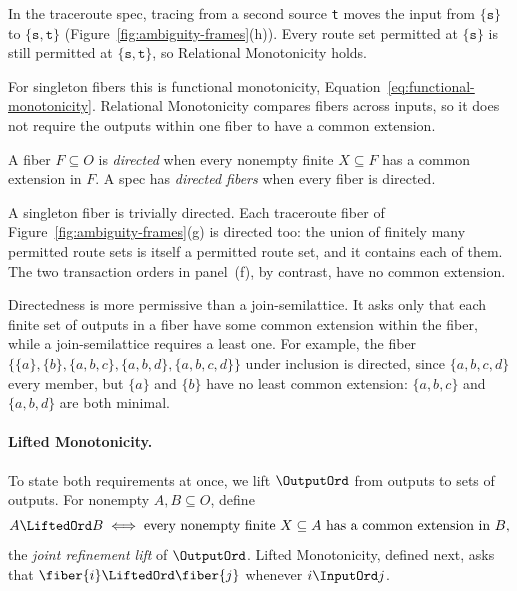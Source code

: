 In the traceroute spec, tracing from a second source \texttt{t} moves the
input from $\{\texttt{s}\}$ to $\{\texttt{s},\texttt{t}\}$
(Figure~\ref{fig:ambiguity-frames}(h)).  Every route set permitted at
$\{\texttt{s}\}$ is still permitted at $\{\texttt{s},\texttt{t}\}$, so
Relational Monotonicity holds.

For singleton fibers this is functional monotonicity,
Equation~\ref{eq:functional-monotonicity}.  Relational Monotonicity compares fibers across inputs, so it does not
require the outputs within one fiber to have a common extension.

\begin{definition}
\label{def:fiber-directedness}\label{def:directed-outputs}
A fiber $F\subseteq O$ is \emph{directed} when every nonempty finite
$X\subseteq F$ has a common extension in $F$.  A spec has \emph{directed fibers} when
every fiber is directed.
\end{definition}

A singleton fiber is trivially directed.  Each traceroute fiber of
Figure~\ref{fig:ambiguity-frames}(g) is directed too: the union of finitely
many permitted route sets is itself a permitted route set, and it contains each
of them.  The two transaction orders in panel~(f), by contrast, have no common extension.

Directedness is more permissive than a join-semilattice.  It asks only that
each finite set of outputs in a fiber have some common extension within the
fiber, while a join-semilattice requires a least one.  For example, the fiber
$\{\{a\},\{b\},\{a,b,c\},\{a,b,d\},\{a,b,c,d\}\}$ under inclusion is directed,
since $\{a,b,c,d\}$ \outrel every member, but $\{a\}$ and $\{b\}$ have no least common extension: $\{a,b,c\}$ and $\{a,b,d\}$ are both minimal.

\paragraph{Lifted Monotonicity.}
To state both requirements at once, we lift $\OutputOrd$ from outputs to sets
of outputs.  For nonempty
$A,B\subseteq O$, define
        \begin{equation}
  A\LiftedOrd B
  \;\Longleftrightarrow\;
  \text{every nonempty finite }X\subseteq A\text{ has a common extension in }B,
  \label{eq:joint-output-order}
        \end{equation}
the \emph{joint refinement lift} of $\OutputOrd$.  Lifted Monotonicity, defined
next, asks that $\fiber{i}\LiftedOrd\fiber{j}$ whenever $i\InputOrd j$.

